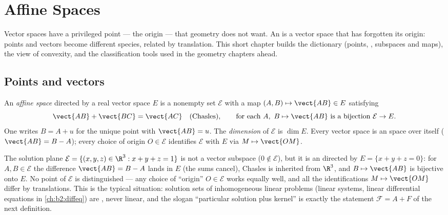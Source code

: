 \chapter{Affine Spaces}\label{ch:b2:affine}

Vector spaces have a privileged point --- the origin --- that
geometry does not want. An \emph{} is a vector space
that has forgotten its origin: points and vectors become different
species, related by translation. This short chapter builds the
dictionary (points, ,  subspaces and maps), the
 view of convexity, and the classification tools used in the
geometry chapters ahead.

\section{Points and vectors}

\begin{definition}\label{def:b2:affine:def}
An \emph{affine space} directed by a real
vector space $E$ is a nonempty set $\mathcal{E}$ with a map
$(A, B) \mapsto \vect{AB} \in E$ satisfying
\[
\vect{AB} + \vect{BC} = \vect{AC}
\quad \text{(Chasles)},
\qquad
\text{for each } A,\ B \mapsto \vect{AB} \text{ is a bijection }
\mathcal{E} \to E .
\]
One writes $B = A + u$ for the unique point with $\vect{AB} = u$.
The \emph{dimension} of $\mathcal{E}$ is $\dim E$. Every vector
space is an  space over itself ($\vect{AB} = B - A$); every
choice of origin $O \in \mathcal{E}$ identifies $\mathcal{E}$ with
$E$ via $M \mapsto \vect{OM}$.
\end{definition}

\begin{example}\label{ex:b2:affine:planeexample}
The solution plane $\mathcal E = \{(x, y, z) \in \R^3 : x + y
+ z = 1\}$ is not a vector subspace ($0 \notin \mathcal E$),
but it is an  directed by $E = \{x + y + z =
0\}$: for $A, B \in \mathcal E$ the difference $\vect{AB} = B
- A$ lands in $E$ (the sums cancel), Chasles is inherited
from $\R^3$, and $B \mapsto \vect{AB}$ is bijective onto $E$.
No point of $\mathcal E$ is distinguished --- any choice of
``origin'' $O \in \mathcal E$ works equally well, and all the
identifications $M \mapsto \vect{OM}$ differ by translations.
This is the typical situation: solution sets of inhomogeneous
linear problems (linear systems, linear differential
equations in \cref{ch:b2:diffeq}) are , never linear,
and the slogan ``particular solution plus kernel'' is exactly
the statement $\mathcal F = A + F$ of the next definition.
\end{example}

